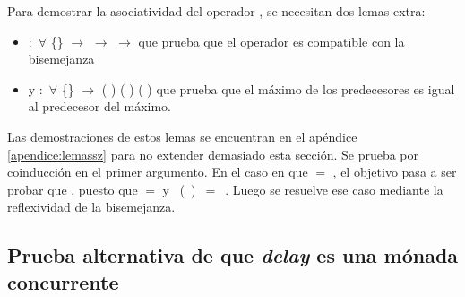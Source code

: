 Para demostrar la asociatividad del operador , se necesitan dos lemas extra:
\begin{itemize}[noitemsep]
\item {} $:$ $\forall$ \{\} $\rightarrow$ \AgdaFunction{[}  \AgdaFunction{]}  \AgdaFunction{$\sim$}  $\rightarrow$ \AgdaFunction{[}  \AgdaFunction{]}  \AgdaFunction{$\sim$}  $\rightarrow$ \AgdaFunction{[}  \AgdaFunction{]}   \AgdaFunction{$\sim$}   que prueba que el operador  es compatible con la bisemejanza 
\item y  $:$ $\forall$ \{\}  $\rightarrow$ \AgdaFunction{[}  \AgdaFunction{]}  ( ) ( ) \AgdaFunction{$\sim$}  ( ) que prueba que el máximo de los predecesores es igual al predecesor del máximo. 
\end{itemize}
Las demostraciones de estos lemas se encuentran en el apéndice \ref{apendice:lemassz} para no extender demasiado esta sección.
Se prueba  por coinducción en el primer argumento. En el caso en que  $=$ , el objetivo pasa a ser probar que \AgdaFunction{[}  \AgdaFunction{]}   \AgdaFunction{$\sim$}  , puesto que    $=$  y \hbox{  ( ) $=$  }. Luego se resuelve ese caso mediante la reflexividad de la bisemejanza. 




\subsection{Prueba alternativa de que \textit{delay} es una mónada concurrente}

